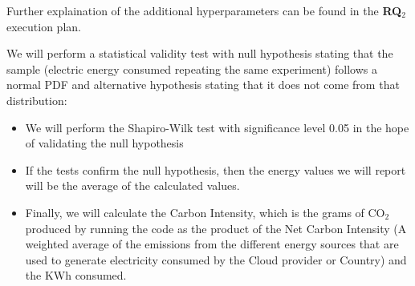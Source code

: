 Further explaination of the additional hyperparameters can be found in the \textbf{RQ$_{2}$} execution plan.

We will perform a statistical validity test with null hypothesis stating that the sample (electric energy consumed repeating the same experiment) follows a normal PDF and alternative hypothesis stating that it does not come from that distribution:
\begin{itemize}
    \item We will perform the Shapiro-Wilk test with significance level 0.05 in the hope of validating the null hypothesis 
    \item If the tests confirm the null hypothesis, then the energy values we will report will be the average of the calculated values.
    \item Finally, we will calculate the Carbon Intensity, which is the grams of CO$_2$ produced by running the code as the product of the Net Carbon Intensity (A weighted average of the emissions from the different energy sources that are used to generate electricity consumed by the Cloud provider or Country) and the KWh consumed.
\end{itemize}

